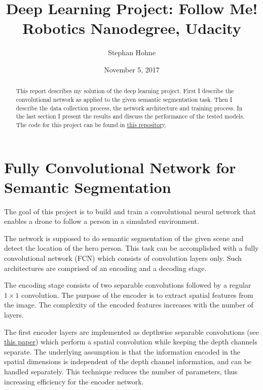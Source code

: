 \documentclass[11pt, onecolumn, oneside, reqno]{article}
\title{Deep Learning Project: Follow Me! \\ Robotics Nanodegree, Udacity}
\author{Stephan Hohne}
\date{November 5, 2017}
\begin{document}
\maketitle

\begin{abstract}
This report describes my solution of the deep learning project. First I describe the convolutional network as applied to the given semantic segmentation task. Then I describe the data collection process, the network architecture and training process. In the last section I present the results and discuss the performance of the tested models. The code for this project can be found in \href{https://github.com/S2H-Mobile/RoboND-DeepLearning-Project-Solution}{this repository}.
\end{abstract}

\tableofcontents

\newpage

\listoftables

\listoffigures

\newpage

\section{Fully Convolutional Network for Semantic Segmentation}
\label{sec:fcn_description}
The goal of this project is to build and train a convolutional neural network that enables a drone to follow a person in a simulated environment.

The network is supposed to do semantic segmentation of the given scene and detect the location of the hero person. This task can be accomplished with a fully convolutional network (FCN) which consists of convolution layers only. Such architectures are comprised of an encoding and a decoding stage.

The encoding stage consists of two separable convolutions followed by a regular $1 \times 1$ convolution. The purpose of the encoder is to extract spatial features from the image. The complexity of the encoded features increases with the number of layers.

The first encoder layers are implemented as depthwise separable convolutions (see \href{https://arxiv.org/pdf/1610.02357.pdf}{this paper}) which perform a spatial convolution while keeping the depth channels separate. The underlying assumption is that the information encoded in the spatial dimensions is independent of the depth channel information, and can be handled separately. This technique reduces the number of parameters, thus increasing efficiency for the encoder network.
\end{document}

